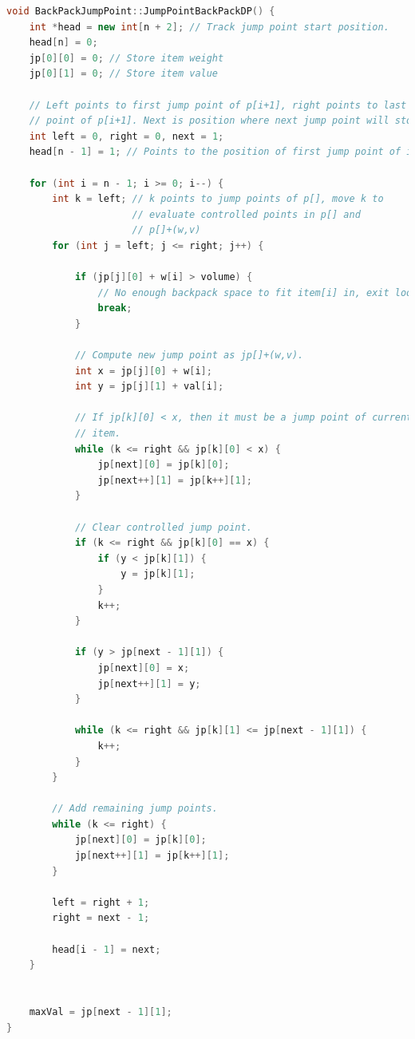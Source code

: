 \begin{lstlisting}[language=c++]
void BackPackJumpPoint::JumpPointBackPackDP() {
    int *head = new int[n + 2]; // Track jump point start position.
    head[n] = 0;
    jp[0][0] = 0; // Store item weight
    jp[0][1] = 0; // Store item value

    // Left points to first jump point of p[i+1], right points to last jump
    // point of p[i+1]. Next is position where next jump point will store.
    int left = 0, right = 0, next = 1;
    head[n - 1] = 1; // Points to the position of first jump point of item[n-1].

    for (int i = n - 1; i >= 0; i--) {
        int k = left; // k points to jump points of p[], move k to
                      // evaluate controlled points in p[] and
                      // p[]+(w,v)
        for (int j = left; j <= right; j++) {

            if (jp[j][0] + w[i] > volume) {
                // No enough backpack space to fit item[i] in, exit loop.
                break;
            }

            // Compute new jump point as jp[]+(w,v).
            int x = jp[j][0] + w[i];
            int y = jp[j][1] + val[i];

            // If jp[k][0] < x, then it must be a jump point of current
            // item.
            while (k <= right && jp[k][0] < x) {
                jp[next][0] = jp[k][0];
                jp[next++][1] = jp[k++][1];
            }

            // Clear controlled jump point.
            if (k <= right && jp[k][0] == x) {
                if (y < jp[k][1]) {
                    y = jp[k][1];
                }
                k++;
            }

            if (y > jp[next - 1][1]) {
                jp[next][0] = x;
                jp[next++][1] = y;
            }

            while (k <= right && jp[k][1] <= jp[next - 1][1]) {
                k++;
            }
        }

        // Add remaining jump points.
        while (k <= right) {
            jp[next][0] = jp[k][0];
            jp[next++][1] = jp[k++][1];
        }

        left = right + 1;
        right = next - 1;

        head[i - 1] = next;
    }


    maxVal = jp[next - 1][1];
}
\end{lstlisting}

